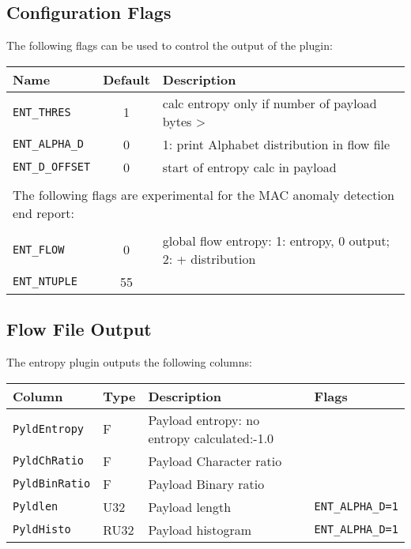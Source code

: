 \documentclass[documentation]{subfiles}
\begin{document}
\subsection{Configuration Flags}
The following flags can be used to control the output of the plugin:
\begin{longtable}{lcl}
    \toprule
    {\bf Name} & {\bf Default} & {\bf Description}\\%
    \midrule\endhead%
    {\tt ENT\_THRES} & 1 & calc entropy only if number of payload bytes > \\
    {\tt ENT\_ALPHA\_D} & 0 & 1: print Alphabet distribution in flow file\\
    {\tt ENT\_D\_OFFSET} & 0 & start of entropy calc in payload\\\\
    \multicolumn{3}{l}{The following flags are experimental for the MAC anomaly detection end report:}\\\\
    {\tt ENT\_FLOW} & 0 & global flow entropy: 1: entropy, 0 output; 2: + distribution\\
    {\tt ENT\_NTUPLE} & 55 & \\
    \bottomrule
\end{longtable}

\subsection{Flow File Output}
The entropy plugin outputs the following columns:
\begin{longtable}{llll}
    \toprule
    {\bf Column} & {\bf Type} & {\bf Description} & {\bf Flags}\\
    \midrule\endhead%
    {\tt PyldEntropy}  &    F & Payload entropy: no entropy calculated:-1.0 \\
    {\tt PyldChRatio}  &    F & Payload Character ratio \\
    {\tt PyldBinRatio} &    F & Payload Binary ratio \\
    {\tt Pyldlen}      &  U32 & Payload length          & {\tt ENT\_ALPHA\_D=1}\\
    {\tt PyldHisto}    & RU32 & Payload histogram       & {\tt ENT\_ALPHA\_D=1}\\
    \bottomrule
\end{longtable}
\end{document}
